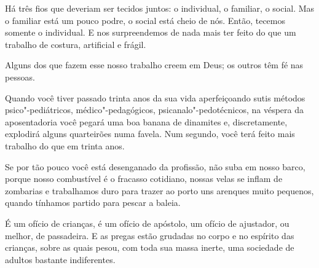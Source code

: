 \bigskip
\bigskip

Há três fios que deveriam ser tecidos juntos: o individual, o familiar,
o social. Mas o familiar está um pouco podre, o social está cheio de
nós. Então, tecemos somente o individual. E nos surpreendemos de nada
mais ter feito do que um trabalho de costura, artificial e frágil.

\bigskip
\bigskip

Alguns dos que fazem esse nosso trabalho creem em Deus; os outros têm fé
nas pessoas.

\bigskip
\bigskip

Quando você tiver passado trinta anos da sua vida aperfeiçoando sutis
métodos psico"-pediátricos, médico"-pedagógicos, psicanalo"-pedotécnicos,
na véspera da aposentadoria você pegará uma boa banana de dinamites e,
discretamente, explodirá alguns quarteirões numa favela. Num segundo,
você terá feito mais trabalho do que em trinta anos.

\bigskip
\bigskip

Se por tão pouco você está desenganado da profissão, não suba em nosso
barco, porque nosso combustível é o fracasso cotidiano, nossas velas se
inflam de zombarias e trabalhamos duro para trazer ao porto uns arenques
muito pequenos, quando tínhamos partido para pescar a baleia.

\bigskip
\bigskip

É um ofício de crianças, é um ofício de apóstolo, um ofício de
ajustador, ou melhor, de passadeira. E as pregas estão grudadas no corpo
e no espírito das crianças, sobre as quais pesou, com toda sua massa
inerte, uma sociedade de adultos bastante indiferentes.

\pagebreak
\thispagestyle{empty}